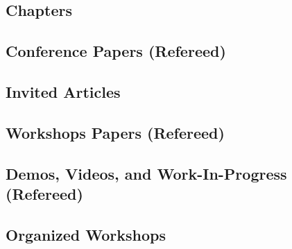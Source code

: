 \documentclass[11pt]{article} %
\begin{document}

\subsection*{Chapters}
\begin{refsection}
\nocite{*}
\printbibliography[heading=none]
\end{refsection}

\subsection*{Conference Papers (Refereed)}
\begin{refsection}
\nocite{*}
\printbibliography[heading=none]
\end{refsection}

\subsection*{Invited Articles}
\begin{refsection}
\nocite{*}
\printbibliography[heading=none]
\end{refsection}

\subsection*{Workshops Papers (Refereed)}
\begin{refsection}
\nocite{*}
\printbibliography[heading=none]
\end{refsection}

\subsection*{Demos, Videos, and Work-In-Progress (Refereed)}
\begin{refsection}
\nocite{*}
\printbibliography[heading=none]
\end{refsection}

\subsection*{Organized Workshops}
\begin{refsection}
\nocite{*}
\printbibliography[heading=none]
\end{refsection}
\end{document}
